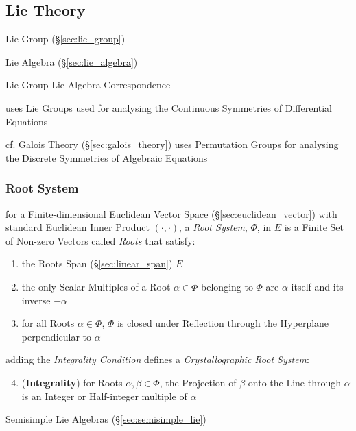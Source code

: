 \subsection{Lie Theory}\label{sec:lie_theory}

Lie Group (\S\ref{sec:lie_group})

Lie Algebra (\S\ref{sec:lie_algebra})

Lie Group-Lie Algebra Correspondence

uses Lie Groups used for analysing the Continuous Symmetries of
Differential Equations %

cf. Galois Theory (\S\ref{sec:galois_theory}) uses Permutation Groups
for analysing the Discrete Symmetries of Algebraic Equations %



\subsubsection{Root System}\label{sec:root_system}

for a Finite-dimensional Euclidean Vector Space (\S\ref{sec:euclidean_vector})
with standard Euclidean Inner Product $(\cdot,\cdot)$, a \emph{Root System},
$\Phi$, in $E$ is a Finite Set of Non-zero Vectors called \emph{Roots} that
satisfy:
\begin{enumerate}
  \item the Roots Span (\S\ref{sec:linear_span}) $E$
  \item the only Scalar Multiples of a Root $\alpha \in \Phi$ belonging to
    $\Phi$ are $\alpha$ itself and its inverse $-\alpha$
  \item for all Roots $\alpha \in \Phi$, $\Phi$ is closed under Reflection
    through the Hyperplane perpendicular to $\alpha$
\end{enumerate}

adding the \emph{Integrality Condition} defines a \emph{Crystallographic Root
  System}:
\begin{enumerate}
  \setcounter{enumi}{3}
  \item (\textbf{Integrality}) for Roots $\alpha, \beta \in \Phi$, the
    Projection of $\beta$ onto the Line through $\alpha$ is an Integer or
    Half-integer multiple of $\alpha$
\end{enumerate}

Semisimple Lie Algebras (\S\ref{sec:semisimple_lie})

